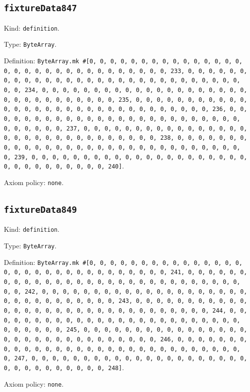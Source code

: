 \documentclass[11pt]{article}
\begin{document}
\subsection*{\texttt{fixtureData847}}
\noindent Kind: \texttt{definition}.\par
\noindent Type: \texttt{ByteArray}.\par
\noindent Definition: \texttt{ByteArray.mk \#[0, 0, 0, 0, 0, 0, 0, 0, 0, 0, 0, 0, 0, 0, 0, 0, 0, 0, 0, 0, 0, 0, 0, 0, 0, 0, 0, 0, 0, 0, 0, 233, 0, 0, 0, 0, 0, 0, 0, 0, 0, 0, 0, 0, 0, 0, 0, 0, 0, 0, 0, 0, 0, 0, 0, 0, 0, 0, 0, 0, 0, 0, 0, 234, 0, 0, 0, 0, 0, 0, 0, 0, 0, 0, 0, 0, 0, 0, 0, 0, 0, 0, 0, 0, 0, 0, 0, 0, 0, 0, 0, 0, 0, 0, 0, 235, 0, 0, 0, 0, 0, 0, 0, 0, 0, 0, 0, 0, 0, 0, 0, 0, 0, 0, 0, 0, 0, 0, 0, 0, 0, 0, 0, 0, 0, 0, 0, 236, 0, 0, 0, 0, 0, 0, 0, 0, 0, 0, 0, 0, 0, 0, 0, 0, 0, 0, 0, 0, 0, 0, 0, 0, 0, 0, 0, 0, 0, 0, 0, 237, 0, 0, 0, 0, 0, 0, 0, 0, 0, 0, 0, 0, 0, 0, 0, 0, 0, 0, 0, 0, 0, 0, 0, 0, 0, 0, 0, 0, 0, 0, 0, 238, 0, 0, 0, 0, 0, 0, 0, 0, 0, 0, 0, 0, 0, 0, 0, 0, 0, 0, 0, 0, 0, 0, 0, 0, 0, 0, 0, 0, 0, 0, 0, 239, 0, 0, 0, 0, 0, 0, 0, 0, 0, 0, 0, 0, 0, 0, 0, 0, 0, 0, 0, 0, 0, 0, 0, 0, 0, 0, 0, 0, 0, 0, 0, 240]}.\par
\noindent Axiom policy: \texttt{none}.\par
\subsection*{\texttt{fixtureData849}}
\noindent Kind: \texttt{definition}.\par
\noindent Type: \texttt{ByteArray}.\par
\noindent Definition: \texttt{ByteArray.mk \#[0, 0, 0, 0, 0, 0, 0, 0, 0, 0, 0, 0, 0, 0, 0, 0, 0, 0, 0, 0, 0, 0, 0, 0, 0, 0, 0, 0, 0, 0, 0, 241, 0, 0, 0, 0, 0, 0, 0, 0, 0, 0, 0, 0, 0, 0, 0, 0, 0, 0, 0, 0, 0, 0, 0, 0, 0, 0, 0, 0, 0, 0, 0, 242, 0, 0, 0, 0, 0, 0, 0, 0, 0, 0, 0, 0, 0, 0, 0, 0, 0, 0, 0, 0, 0, 0, 0, 0, 0, 0, 0, 0, 0, 0, 0, 243, 0, 0, 0, 0, 0, 0, 0, 0, 0, 0, 0, 0, 0, 0, 0, 0, 0, 0, 0, 0, 0, 0, 0, 0, 0, 0, 0, 0, 0, 0, 0, 244, 0, 0, 0, 0, 0, 0, 0, 0, 0, 0, 0, 0, 0, 0, 0, 0, 0, 0, 0, 0, 0, 0, 0, 0, 0, 0, 0, 0, 0, 0, 0, 245, 0, 0, 0, 0, 0, 0, 0, 0, 0, 0, 0, 0, 0, 0, 0, 0, 0, 0, 0, 0, 0, 0, 0, 0, 0, 0, 0, 0, 0, 0, 0, 246, 0, 0, 0, 0, 0, 0, 0, 0, 0, 0, 0, 0, 0, 0, 0, 0, 0, 0, 0, 0, 0, 0, 0, 0, 0, 0, 0, 0, 0, 0, 0, 247, 0, 0, 0, 0, 0, 0, 0, 0, 0, 0, 0, 0, 0, 0, 0, 0, 0, 0, 0, 0, 0, 0, 0, 0, 0, 0, 0, 0, 0, 0, 0, 248]}.\par
\noindent Axiom policy: \texttt{none}.\par
\end{document}
